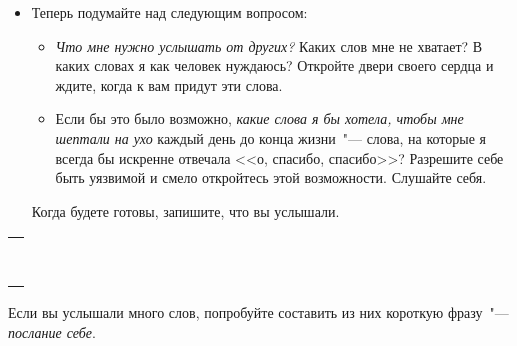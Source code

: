 \newpage
{}
\begin{itemize}
	\item Теперь подумайте над следующим вопросом:
	
	\begin{itemize}
		\item \emph{Что мне нужно услышать от других?} Каких слов мне не хватает? В каких словах я как человек нуждаюсь? Откройте двери своего сердца и ждите, когда к вам придут эти слова.
		
		\item Если бы это было возможно, \emph{какие слова я бы хотела, чтобы мне шептали на ухо} каждый день до конца жизни~"--- слова, на которые я всегда бы искренне отвечала <<о, спасибо, спасибо>>? Разрешите себе быть уязвимой и смело откройтесь этой возможности. Слушайте себя.
	\end{itemize}

	\itemWritingHand Когда будете готовы, запишите, что вы услышали.
\end{itemize}

\setlength{\extrarowheight}{2mm}
\begin{tabularx}{\textwidth}{X}
	\\
	\arrayrulecolor{gray}\hline\\
	\hline\\
	\hline\\
	\hline\\
	\hline\\
	\hline\\
	\hline\\
	\hline\\
	\hline\\
\end{tabularx}
\setlength{\extrarowheight}{0mm}
\begin{itemize}
	\itemWritingHand Если вы услышали много слов, попробуйте составить из них короткую фразу~"--- \emph{послание себе}. 
\end{itemize}

